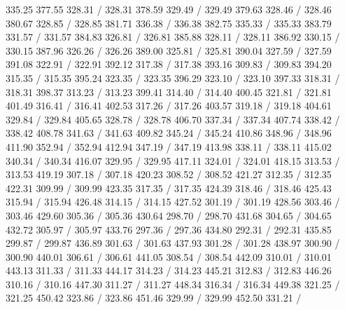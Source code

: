 { 335.25 377.55 328.31 /
 328.31 378.59 329.49 /
 329.49 379.63 328.46 /
 328.46 380.67 328.85 /
 328.85 381.71 336.38 /
 336.38 382.75 335.33 /
 335.33 383.79 331.57 /
 331.57 384.83 326.81 /
 326.81 385.88 328.11 /
 328.11 386.92 330.15 /
 330.15 387.96 326.26 /
 326.26 389.00 325.81 /
 325.81 390.04 327.59 /
 327.59 391.08 322.91 /
 322.91 392.12 317.38 /
 317.38 393.16 309.83 /
 309.83 394.20 315.35 /
 315.35 395.24 323.35 /
 323.35 396.29 323.10 /
 323.10 397.33 318.31 /
 318.31 398.37 313.23 /
 313.23 399.41 314.40 /
 314.40 400.45 321.81 /
 321.81 401.49 316.41 /
 316.41 402.53 317.26 /
 317.26 403.57 319.18 /
 319.18 404.61 329.84 /
 329.84 405.65 328.78 /
 328.78 406.70 337.34 /
 337.34 407.74 338.42 /
 338.42 408.78 341.63 /
 341.63 409.82 345.24 /
 345.24 410.86 348.96 /
 348.96 411.90 352.94 /
 352.94 412.94 347.19 /
 347.19 413.98 338.11 /
 338.11 415.02 340.34 /
 340.34 416.07 329.95 /
 329.95 417.11 324.01 /
 324.01 418.15 313.53 /
 313.53 419.19 307.18 /
 307.18 420.23 308.52 /
 308.52 421.27 312.35 /
 312.35 422.31 309.99 /
 309.99 423.35 317.35 /
 317.35 424.39 318.46 /
 318.46 425.43 315.94 /
 315.94 426.48 314.15 /
 314.15 427.52 301.19 /
 301.19 428.56 303.46 /
 303.46 429.60 305.36 /
 305.36 430.64 298.70 /
 298.70 431.68 304.65 /
 304.65 432.72 305.97 /
 305.97 433.76 297.36 /
 297.36 434.80 292.31 /
 292.31 435.85 299.87 /
 299.87 436.89 301.63 /
 301.63 437.93 301.28 /
 301.28 438.97 300.90 /
 300.90 440.01 306.61 /
 306.61 441.05 308.54 /
 308.54 442.09 310.01 /
 310.01 443.13 311.33 /
 311.33 444.17 314.23 /
 314.23 445.21 312.83 /
 312.83 446.26 310.16 /
 310.16 447.30 311.27 /
 311.27 448.34 316.34 /
 316.34 449.38 321.25 /
 321.25 450.42 323.86 /
 323.86 451.46 329.99 /
 329.99 452.50 331.21 /
}
